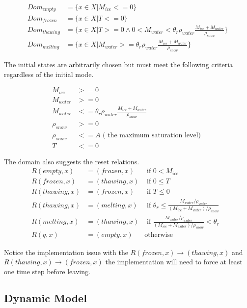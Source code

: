 \documentclass{article}
\begin{document}
\begin{align}
Dom_{empty} &= \{x \in X \big| M_{ice} <= 0\} \\
Dom_{frozen} &= \{x \in X \big| T <= 0\} \\
Dom_{thawing} &= \{x \in X \big| T >= 0
    \wedge 0 < M_{water} <
    \theta_{r} \rho_{water} \frac{M_{ice} + M_{water}}{\rho_{snow}}\} \\
Dom_{melting} &= \{x \in X \big|  M_{water} >=
    \theta_{r} \rho_{water} \frac{M_{ice} + M_{water}}{\rho_{snow}}\}
\end{align}

The initial states are arbitrarily chosen but must meet
the following criteria regardless of the initial mode.

\begin{align}
M_{ice} &>= 0 \\
M_{water} &>= 0 \\
M_{water} &<= \theta_{r} \rho_{water} \frac{M_{ice} + M_{water}}{\rho_{snow}} \\
\rho_{snow} &>= 0 \\
\rho_{snow} &<= A \text{ ( the maximum saturation level) } \\
T &<= 0
\end{align}

The domain also suggests the reset relations.
\begin{align}
R(empty,x) &= (frozen, x)  & \textrm{  if $0 < M_{ice}$ } \\
R(frozen,x) &= (thawing,x) & \textrm{  if $0 \le T$ } \\
R(thawing,x) &= (frozen,x) & \textrm{  if $T \le 0$ } \\
R(thawing,x) &= (melting,x) & \textrm{  if
   $\theta_{r} \le \frac{M_{water} / \rho_{water} }
        {(M_{ice} + M_{water}) / \rho_{snow}}$  } \\
R(melting,x) &= (thawing,x) & \textrm{  if
      $\frac{M_{water} / \rho_{water} }
        {(M_{ice} + M_{water}) / \rho_{snow}} < \theta_{r}$  } \\
R(q,x) &= (empty, x) & \textrm{otherwise}
\end{align}

Notice the implementation issue with the $R(frozen,x) \to (thawing,x)$ and
$R(thawing,x) \to (frozen,x)$ the implementation will need to
force at least one time step before leaving.


\subsection{Dynamic Model}
\end{document}
